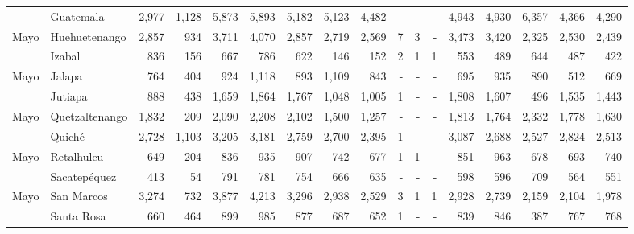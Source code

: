 \begin{landscape}
\begin{center}
\begin{longtable}{llrrrrrrrrrrrrrrr}
			\rowcolor{color1!5!white}\multicolumn{1}{l}{	\footnotesize	 Mayo 	}&	 Guatemala 	&	 2,977 	&	 1,128 	&	 5,873 	&	 5,893 	&	 5,182 	&	 5,123 	&	 4,482 	&	 -   	&	 -   	&	 -   	&	 4,943 	&	 4,930 	&	 6,357 	&	 4,366 	&	 4,290 	\\
			\multicolumn{1}{l}{	\footnotesize	 Mayo 	}&	 Huehuetenango 	&	 2,857 	&	 934 	&	 3,711 	&	 4,070 	&	 2,857 	&	 2,719 	&	 2,569 	&	 7 	&	 3 	&	 -   	&	 3,473 	&	 3,420 	&	 2,325 	&	 2,530 	&	 2,439 	\\
			\rowcolor{color1!5!white}\multicolumn{1}{l}{	\footnotesize	 Mayo 	}&	 Izabal 	&	 836 	&	 156 	&	 667 	&	 786 	&	 622 	&	 146 	&	 152 	&	 2 	&	 1 	&	 1 	&	 553 	&	 489 	&	 644 	&	 487 	&	 422 	\\
			\multicolumn{1}{l}{	\footnotesize	 Mayo 	}&	 Jalapa 	&	 764 	&	 404 	&	 924 	&	 1,118 	&	 893 	&	 1,109 	&	 843 	&	 -   	&	 -   	&	 -   	&	 695 	&	 935 	&	 890 	&	 512 	&	 669 	\\
			\rowcolor{color1!5!white}\multicolumn{1}{l}{	\footnotesize	 Mayo 	}&	 Jutiapa 	&	 888 	&	 438 	&	 1,659 	&	 1,864 	&	 1,767 	&	 1,048 	&	 1,005 	&	 1 	&	 -   	&	 -   	&	 1,808 	&	 1,607 	&	 496 	&	 1,535 	&	 1,443 	\\
			\multicolumn{1}{l}{	\footnotesize	 Mayo 	}&	 Quetzaltenango 	&	 1,832 	&	 209 	&	 2,090 	&	 2,208 	&	 2,102 	&	 1,500 	&	 1,257 	&	 -   	&	 -   	&	 -   	&	 1,813 	&	 1,764 	&	 2,332 	&	 1,778 	&	 1,630 	\\
			\rowcolor{color1!5!white}\multicolumn{1}{l}{	\footnotesize	 Mayo 	}&	 Quiché 	&	 2,728 	&	 1,103 	&	 3,205 	&	 3,181 	&	 2,759 	&	 2,700 	&	 2,395 	&	 1 	&	 -   	&	 -   	&	 3,087 	&	 2,688 	&	 2,527 	&	 2,824 	&	 2,513 	\\
			\multicolumn{1}{l}{	\footnotesize	 Mayo 	}&	 Retalhuleu 	&	 649 	&	 204 	&	 836 	&	 935 	&	 907 	&	 742 	&	 677 	&	 1 	&	 1 	&	 -   	&	 851 	&	 963 	&	 678 	&	 693 	&	 740 	\\
			\rowcolor{color1!5!white}\multicolumn{1}{l}{	\footnotesize	 Mayo 	}&	 Sacatepéquez 	&	 413 	&	 54 	&	 791 	&	 781 	&	 754 	&	 666 	&	 635 	&	 -   	&	 -   	&	 -   	&	 598 	&	 596 	&	 709 	&	 564 	&	 551 	\\
			\multicolumn{1}{l}{	\footnotesize	 Mayo 	}&	 San Marcos 	&	 3,274 	&	 732 	&	 3,877 	&	 4,213 	&	 3,296 	&	 2,938 	&	 2,529 	&	 3 	&	 1 	&	 1 	&	 2,928 	&	 2,739 	&	 2,159 	&	 2,104 	&	 1,978 	\\
			\rowcolor{color1!5!white}\multicolumn{1}{l}{	\footnotesize	 Mayo 	}&	 Santa Rosa 	&	 660 	&	 464 	&	 899 	&	 985 	&	 877 	&	 687 	&	 652 	&	 1 	&	 -   	&	 -   	&	 839 	&	 846 	&	 387 	&	 767 	&	 768 	\\

\end{longtable}
\end{center}
\end{landscape}
